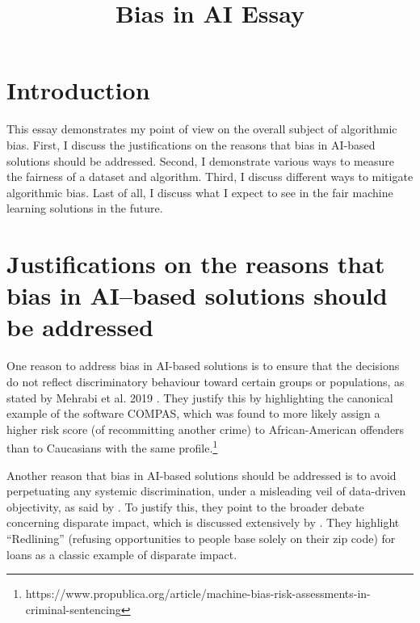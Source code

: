 \documentclass[conference]{IEEEtran}
\begin{document}
\title{Bias in AI Essay
}

\author{
}

\maketitle

\begin{abstract}

\end{abstract}

\begin{IEEEkeywords}

\end{IEEEkeywords}

\section{Introduction}
This essay demonstrates my point of view on the overall subject of algorithmic bias. First, I discuss the justifications on the reasons that bias in AI-based solutions should be addressed. Second, I demonstrate various ways to measure the fairness of a dataset and algorithm. Third, I discuss different ways to mitigate algorithmic bias. Last of all, I discuss what I expect to see in the fair machine learning solutions in the future.

\section{Justifications on the reasons that bias in AI–based solutions should be addressed}
One reason to address bias in AI-based solutions is to ensure that the decisions do not reflect discriminatory behaviour toward certain groups or populations, as stated by Mehrabi et al. 2019 \cite{DBLP:journals/corr/abs-1908-09635}. They justify this by highlighting the canonical example of the software COMPAS, which was found to more likely assign a higher risk score (of recommitting another crime) to African-American offenders than to Caucasians with the same profile.\footnote{https://www.propublica.org/article/machine-bias-risk-assessments-in-criminal-sentencing} 

Another reason that bias in AI-based solutions should be addressed is to avoid perpetuating any systemic discrimination, under a misleading veil of data-driven objectivity, as said by \cite{d_Alessandro_2017}. To justify this, they point to the broader debate concerning disparate impact, which is discussed extensively by \cite{10.2307/24758720}. They highlight “Redlining” (refusing opportunities to people base solely on their zip code) for loans as a classic example of disparate impact.
\end{document}
